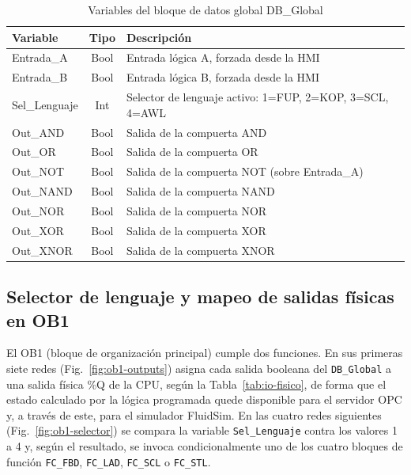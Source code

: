 \documentclass[conference]{IEEEtran}
\begin{document}
\begin{table}[H]
\centering
\caption{Variables del bloque de datos global DB\_Global}
\label{tab:db-vars}
\renewcommand{\arraystretch}{1.2}
\begin{tabular}{|l|c|p{3.6cm}|}
\hline
\textbf{Variable} & \textbf{Tipo} & \textbf{Descripción} \\
\hline
Entrada\_A & Bool & Entrada lógica A, forzada desde la HMI \\ \hline
Entrada\_B & Bool & Entrada lógica B, forzada desde la HMI \\ \hline
Sel\_Lenguaje & Int & Selector de lenguaje activo: 1=FUP, 2=KOP, 3=SCL, 4=AWL \\ \hline
Out\_AND & Bool & Salida de la compuerta AND \\ \hline
Out\_OR & Bool & Salida de la compuerta OR \\ \hline
Out\_NOT & Bool & Salida de la compuerta NOT (sobre Entrada\_A) \\ \hline
Out\_NAND & Bool & Salida de la compuerta NAND \\ \hline
Out\_NOR & Bool & Salida de la compuerta NOR \\ \hline
Out\_XOR & Bool & Salida de la compuerta XOR \\ \hline
Out\_XNOR & Bool & Salida de la compuerta XNOR \\ \hline
\end{tabular}
\end{table}

\subsection{Selector de lenguaje y mapeo de salidas físicas en OB1}

El OB1 (bloque de organización principal) cumple dos funciones. En sus primeras siete redes (Fig.~\ref{fig:ob1-outputs}) asigna cada salida booleana del \texttt{DB\_Global} a una salida física \%Q de la CPU, según la Tabla~\ref{tab:io-fisico}, de forma que el estado calculado por la lógica programada quede disponible para el servidor OPC y, a través de este, para el simulador FluidSim\textregistered. En las cuatro redes siguientes (Fig.~\ref{fig:ob1-selector}) se compara la variable \texttt{Sel\_Lenguaje} contra los valores 1 a 4 y, según el resultado, se invoca condicionalmente uno de los cuatro bloques de función \texttt{FC\_FBD}, \texttt{FC\_LAD}, \texttt{FC\_SCL} o \texttt{FC\_STL}.
\end{document}
